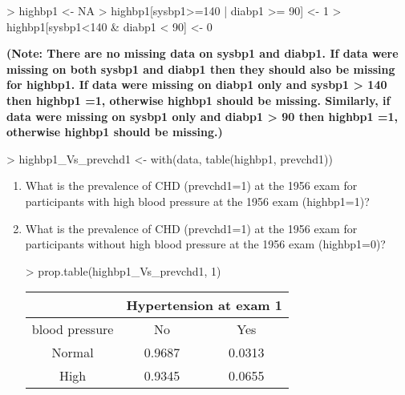 \documentclass{article}
\begin{document}
\begin{Schunk}
\begin{Sinput}
> highbp1 <- NA
> highbp1[sysbp1>=140 | diabp1 >= 90] <- 1 
> highbp1[sysbp1<140 & diabp1 < 90] <- 0
\end{Sinput}
\end{Schunk}

\textbf{(Note: There are no missing data on sysbp1 and diabp1. If data were missing on both sysbp1 and diabp1 then they should also be missing for highbp1. If data were missing on diabp1 only and sysbp1 > 140 then highbp1 =1, otherwise highbp1 should be missing.  Similarly, if data were missing on sysbp1 only and diabp1 > 90 then highbp1 =1, otherwise highbp1 should be missing.)}

\begin{Schunk}
\begin{Sinput}
> highbp1_Vs_prevchd1 <- with(data, table(highbp1, prevchd1))
\end{Sinput}
\end{Schunk}


\begin{enumerate}
  \item What is the prevalence of CHD (prevchd1=1) at the 1956 exam for participants with high blood pressure at the 1956 exam (highbp1=1)?
  \item What is the prevalence of CHD (prevchd1=1) at the 1956 exam for participants without high blood pressure at the 1956 exam (highbp1=0)?

\begin{Schunk}
\begin{Sinput}
> prop.table(highbp1_Vs_prevchd1, 1)
\end{Sinput}
\end{Schunk}

\begin{table}[ht]
\begin{center}
\begin{tabular}{ccc}
& \multicolumn{2}{c}{Hypertension at exam 1}\\  
  \hline
blood pressure & No & Yes \\ 
  \hline
Normal & 0.9687 & 0.0313 \\ 
High & 0.9345 & 0.0655 \\ 
   \hline
\end{tabular}
\end{center}
\end{table}

\end{enumerate}
\end{document}
